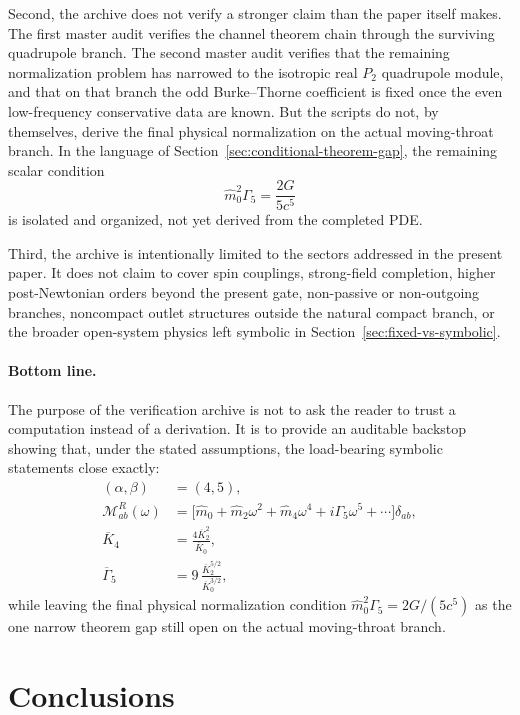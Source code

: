 \documentclass[11pt]{article}
\begin{document}
Second, the archive does not verify a stronger claim than the paper itself makes.
The first master audit verifies the channel theorem chain through the surviving
quadrupole branch.  The second master audit verifies that the remaining
normalization problem has narrowed to the isotropic real $P_2$ quadrupole
module, and that on that branch the odd Burke--Thorne coefficient is fixed once
the even low-frequency conservative data are known.  But the scripts do not, by
themselves, derive the final physical normalization on the actual moving-throat
branch.  In the language of Section~\ref{sec:conditional-theorem-gap}, the
remaining scalar condition
\[
\hat m_0^2\Gamma_5=\frac{2G}{5c^5}
\]
is isolated and organized, not yet derived from the completed PDE.

Third, the archive is intentionally limited to the sectors addressed in the
present paper.  It does not claim to cover spin couplings, strong-field
completion, higher post-Newtonian orders beyond the present gate, non-passive or
non-outgoing branches, noncompact outlet structures outside the natural compact
branch, or the broader open-system physics left symbolic in
Section~\ref{sec:fixed-vs-symbolic}.

\paragraph{Bottom line.}
The purpose of the verification archive is not to ask the reader to trust a
computation instead of a derivation.  It is to provide an auditable backstop
showing that, under the stated assumptions, the load-bearing symbolic statements
close exactly:
\[
\begin{aligned}
(\alpha,\beta)&=(4,5),\\
\mathcal M_{ab}^R(\omega)
&=
\bigl[\hat m_0+\hat m_2\omega^2+\hat m_4\omega^4+i\Gamma_5\omega^5+\cdots\bigr]\delta_{ab},\\
\overline K_4&=\frac{4\overline K_2^2}{\overline K_0},\\
\overline\Gamma_5
&=9\,\frac{\overline K_2^{5/2}}{\overline K_0^{3/2}},
\end{aligned}
\]
while leaving the final physical normalization condition
\(
\hat m_0^2\Gamma_5=2G/(5c^5)
\)
as the one narrow theorem gap still open on the actual moving-throat branch.

\section{Conclusions}
\label{sec:conclusion}
\end{document}
